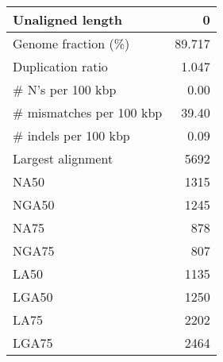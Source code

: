 \documentclass[12pt,a4paper]{article}
\begin{document}
\begin{table}[ht]
\begin{center}
\begin{tabular}{|l*{1}{|r}|}
Unaligned length & 0 \\ \hline
Genome fraction (\%) & 89.717 \\ \hline
Duplication ratio & 1.047 \\ \hline
\# N's per 100 kbp & 0.00 \\ \hline
\# mismatches per 100 kbp & 39.40 \\ \hline
\# indels per 100 kbp & 0.09 \\ \hline
Largest alignment & 5692 \\ \hline
NA50 & 1315 \\ \hline
NGA50 & 1245 \\ \hline
NA75 & 878 \\ \hline
NGA75 & 807 \\ \hline
LA50 & 1135 \\ \hline
LGA50 & 1250 \\ \hline
LA75 & 2202 \\ \hline
LGA75 & 2464 \\ \hline
\end{tabular}
\end{center}
\end{table}
\end{document}
